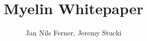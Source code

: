 \documentclass[a4paper]{article}
\title{Myelin Whitepaper}
\author{Jan Nils Ferner, Jeremy Stucki}
\begin{document}
\maketitle
\thispagestyle{empty}

\clearpage

\twocolumn

\begin{abstract}
	
\end{abstract}

\clearpage

\onecolumn
\tableofcontents
\twocolumn

\clearpage







\clearpage

\nocite{*}


\end{document}
